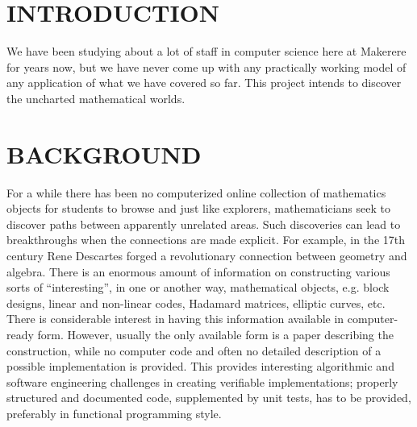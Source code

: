 \documentclass{article}
\begin{document}
\section{INTRODUCTION}\label{sec:intro}
We have been studying about a lot of staff in computer science here at Makerere for years now, but we have never come up with any practically working model of any application of what we have covered so far. This project intends to discover the uncharted mathematical worlds. \\
\section{BACKGROUND}
For a while there has been no computerized online collection of mathematics objects for students to browse and just like explorers, mathematicians seek to discover paths between apparently unrelated areas. Such discoveries can lead to breakthroughs when the connections are made explicit. For example, in the 17th century Rene Descartes forged a revolutionary connection between geometry and algebra. 
There is an enormous amount of information on constructing various sorts of “interesting”, in one or another way, mathematical objects, e.g. block designs, linear and non-linear codes, Hadamard matrices, elliptic curves, etc.  There is considerable interest in having this information available in computer-ready form.  However, usually the only available form is a paper describing the construction, while no computer code and often no detailed description of a possible implementation is provided. This provides interesting algorithmic and software engineering challenges in creating verifiable implementations; properly structured and documented code, supplemented by unit tests, has to be provided, preferably in functional programming style. \\
\end{document}
